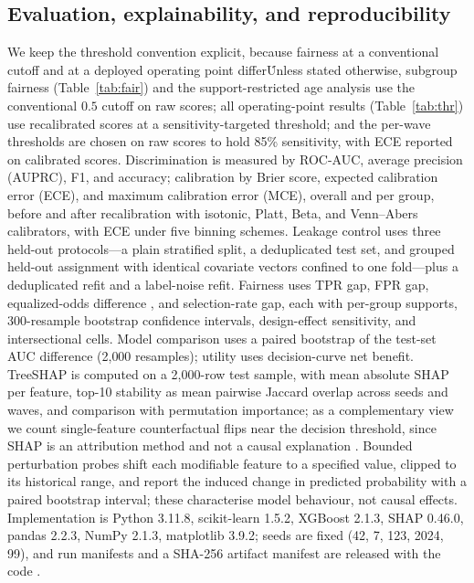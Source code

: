 \documentclass[conference]{IEEEtran}
\begin{document}
\subsection{Evaluation, explainability, and reproducibility}
We keep the threshold convention explicit, because fairness at a conventional cutoff and at a deployed operating point differ\. Unless stated otherwise, subgroup fairness (Table~\ref{tab:fair}) and the support-restricted age analysis use the conventional $0.5$ cutoff on raw scores; all operating-point results (Table~\ref{tab:thr}) use recalibrated scores at a sensitivity-targeted threshold; and the per-wave thresholds are chosen on raw scores to hold 85\% sensitivity, with ECE reported on calibrated scores. Discrimination is measured by ROC-AUC, average precision (AUPRC), F1, and accuracy; calibration by Brier score, expected calibration error (ECE), and maximum calibration error (MCE), overall and per group, before and after recalibration with isotonic, Platt, Beta, and Venn--Abers calibrators, with ECE under five binning schemes. Leakage control uses three held-out protocols---a plain stratified split, a deduplicated test set, and grouped held-out assignment with identical covariate vectors confined to one fold---plus a deduplicated refit and a label-noise refit. Fairness uses TPR gap, FPR gap, equalized-odds difference \cite{hardt2016}, and selection-rate gap, each with per-group supports, 300-resample bootstrap confidence intervals, design-effect sensitivity, and intersectional cells. Model comparison uses a paired bootstrap of the test-set AUC difference (2{,}000 resamples); utility uses decision-curve net benefit. TreeSHAP \cite{shap2017} is computed on a 2{,}000-row test sample, with mean absolute SHAP per feature, top-10 stability as mean pairwise Jaccard overlap across seeds and waves, and comparison with permutation importance; as a complementary view we count single-feature counterfactual flips near the decision threshold, since SHAP is an attribution method and not a causal explanation \cite{shaplimits}. Bounded perturbation probes shift each modifiable feature to a specified value, clipped to its historical range, and report the induced change in predicted probability with a paired bootstrap interval; these characterise model behaviour, not causal effects. Implementation is Python 3.11.8, scikit-learn 1.5.2, XGBoost 2.1.3, SHAP 0.46.0, pandas 2.2.3, NumPy 2.1.3, matplotlib 3.9.2; seeds are fixed (42, 7, 123, 2024, 99), and run manifests and a SHA-256 artifact manifest are released with the code \cite{repo}.
\end{document}
